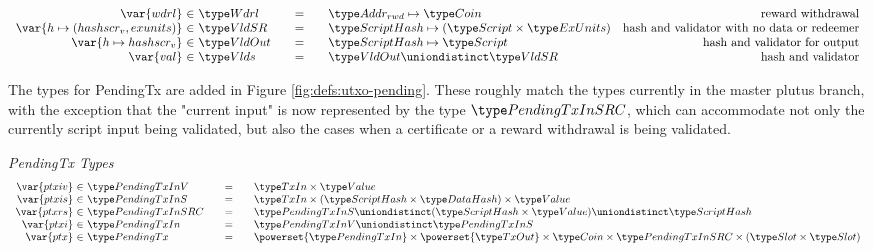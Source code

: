 \begin{figure*}[htb]
\begin{equation*}
\begin{array}{r@{~\in~}l@{\qquad=\qquad}lr}
      \var{wdrl}
      & \Wdrl
      & \AddrRWD \mapsto \Coin
      & \text{reward withdrawal}
      \\
      \var{h \mapsto (hashscr_v,exunits)}
      & \VldSR
      & \HashScr \mapsto (\Script \times \ExUnits)
      & \text{hash and validator with no data or redeemer}
      \\
      \var{h \mapsto hashscr_v}
      & \VldOut
      & \HashScr \mapsto \Script
      & \text{hash and validator for output}
      \\
      \var{val}
      & \Vlds
      & \VldOut \uniondistinct \VldSR
      & \text{hash and validator}
    \end{array}
  \end{equation*}
  \caption{Definitions used in the UTxO transition system}
  \label{fig:defs:utxo-shelley-1}
\end{figure*}

The types for PendingTx are added in Figure \ref{fig:defs:utxo-pending}.
These roughly match the types currently in the master plutus branch,
with the exception that the "current input" is now represented by the type
$\PendingTxInSRC$, which can accommodate not only the currently script input
being validated, but also the cases when a certificate or a reward withdrawal
is being validated.

\begin{figure*}[htb]
  \emph{PendingTx Types}
  \begin{equation*}
    \begin{array}{r@{~\in~}l@{\qquad=\qquad}l}
      \var{ptxiv}
      & \PendingTxInV
      & \TxIn \times \Value
      \\
      \var{ptxis}
      & \PendingTxInS
      & \TxIn \times (\HashScr \times \HashDat) \times \Value
      \\
      \var{ptxrs}
      & \PendingTxInSRC
      & \PendingTxInS \uniondistinct (\HashScr \times \Value) \uniondistinct \HashScr
      \\
      \var{ptxi}
      & \PendingTxIn
      & \PendingTxInV \uniondistinct \PendingTxInS
      \\
      \var{ptx}
      & \PendingTx
      & \powerset{\PendingTxIn} \times  \powerset{\TxOut} \times \Coin \times
      \PendingTxInSRC \times (\Slot\times\Slot)
      \\
    \end{array}
  \end{equation*}
  \caption{Definitions used to make PendingTx}
  \label{fig:defs:utxo-pending}
\end{figure*}


